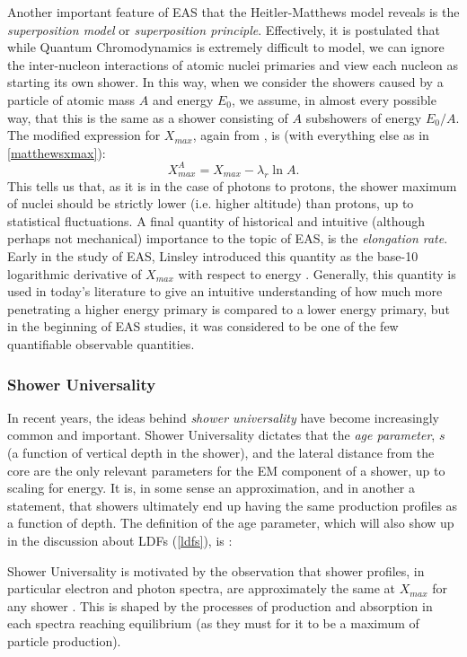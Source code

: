 Another important feature of EAS that the Heitler-Matthews model reveals is the \textit{superposition model} or \textit{superposition principle}. Effectively, it is postulated that while Quantum Chromodynamics is extremely difficult to model, we can ignore the inter-nucleon interactions of atomic nuclei primaries and view each nucleon as starting its own shower. In this way, when we consider the showers caused by a particle of atomic mass $A$ and energy $E_0$, we assume, in almost every possible way, that this is the same as a shower consisting of $A$ subshowers of energy $E_0/A$. The modified expression for $X_{max}$, again from \textcite{matthews}, is (with everything else as in \autoref{matthewsxmax}):
$$X_{max}^A=X_{max}-\lambda_r \ln A.$$
This tells us that, as it is in the case of photons to protons, the shower maximum of nuclei should be strictly lower (i.e. higher altitude) than protons, up to statistical fluctuations. A final quantity of historical and intuitive (although perhaps not mechanical) importance to the topic of EAS, is the \textit{elongation rate}. Early in the study of EAS, Linsley introduced this quantity as the base-10 logarithmic derivative of $X_{max}$ with respect to energy \cite{stanev,crapp2,matthews}. Generally, this quantity is used in today's literature to give an intuitive understanding of how much more penetrating a higher energy primary is compared to a lower energy primary, but in the beginning of EAS studies, it was considered to be one of the few quantifiable observable quantities.
\subsubsection{Shower Universality}
\label{universality}
In recent years, the ideas behind \textit{shower universality} have become increasingly common and important. Shower Universality dictates that the \textit{age parameter}, $s$ (a function of vertical depth in the shower), and the lateral distance from the core are the only relevant parameters for the EM component of a shower, up to scaling for energy. It is, in some sense an approximation, and in another a statement, that showers ultimately end up having the same production profiles as a function of depth.  The definition of the age parameter, which will also show up in the discussion about LDFs (\autoref{ldfs}), is \cite{crapp2}:


Shower Universality is motivated by the observation that shower profiles, in particular electron and photon spectra, are approximately the same at $X_{max}$ for any shower \cite{universality}. This is shaped by the processes of production and absorption in each spectra reaching equilibrium (as they must for it to be a maximum of particle production). 

